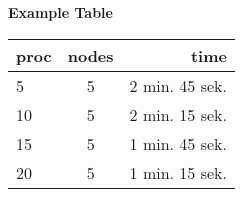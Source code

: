 \textbf{Example Table}\\
\begin{center}
  \begin{tabular}{| l | c | r |}
    \hline
    \textbf{proc} & \textbf{nodes} & \textbf{time} \\
    \hline
    5  & 5 & 2 min. 45 sek. \\
    10 & 5 & 2 min. 15 sek. \\
    15 & 5 & 1 min. 45 sek. \\
    20 & 5 & 1 min. 15 sek. \\
    \hline
  \end{tabular}
\end{center}
